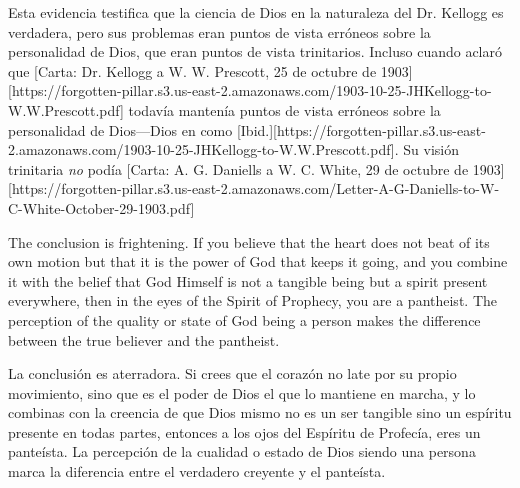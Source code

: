 Esta evidencia testifica que la ciencia de Dios en la naturaleza del Dr. Kellogg es verdadera, pero sus problemas eran puntos de vista erróneos sobre la personalidad de Dios, que eran puntos de vista trinitarios. Incluso cuando aclaró que [Carta: Dr. Kellogg a W. W. Prescott, 25 de octubre de 1903][https://forgotten-pillar.s3.us-east-2.amazonaws.com/1903-10-25-JHKellogg-to-W.W.Prescott.pdf] todavía mantenía puntos de vista erróneos sobre la personalidad de Dios—Dios en  como [Ibid.][https://forgotten-pillar.s3.us-east-2.amazonaws.com/1903-10-25-JHKellogg-to-W.W.Prescott.pdf]. Su visión trinitaria \textit{no} podía [Carta: A. G. Daniells a W. C. White, 29 de octubre de 1903][https://forgotten-pillar.s3.us-east-2.amazonaws.com/Letter-A-G-Daniells-to-W-C-White-October-29-1903.pdf]


The conclusion is frightening. If you believe that the heart does not beat of its own motion but that it is the power of God that keeps it going, and you combine it with the belief that God Himself is not a tangible being but a spirit present everywhere, then in the eyes of the Spirit of Prophecy, you are a pantheist. The perception of the quality or state of God being a person makes the difference between the true believer and the pantheist.


La conclusión es aterradora. Si crees que el corazón no late por su propio movimiento, sino que es el poder de Dios el que lo mantiene en marcha, y lo combinas con la creencia de que Dios mismo no es un ser tangible sino un espíritu presente en todas partes, entonces a los ojos del Espíritu de Profecía, eres un panteísta. La percepción de la cualidad o estado de Dios siendo una persona marca la diferencia entre el verdadero creyente y el panteísta.







